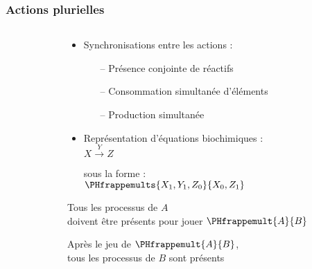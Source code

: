 
\begin{frame}[c]
  \frametitle{Actions plurielles}

\begin{columns}
\begin{column}{.4\textwidth}


\end{column}
\begin{column}{.55\textwidth}
\begin{center}

\begin{itemize}
  \item Synchronisations entre les actions :
  \begin{itemize}
    \item[--] Présence conjointe de réactifs
    \item[--] Consommation simultanée d'éléments
    \item[--] Production simultanée
  \end{itemize}
  \item Représentation d'équations biochimiques :\\
    \centering $X \xrightarrow{Y} Z$\\
    \raggedright sous la forme :\\
    \centering $\PHfrappemults{X_1, Y_1, Z_0}{X_0, Z_1}$
\end{itemize}

\vspace*{.5cm}


\vspace*{.5cm}
Tous les processus de $A$\\
doivent être présents pour jouer $\PHfrappemult{A}{B}$

\medskip
Après le jeu de $\PHfrappemult{A}{B}$,\\
tous les processus de $B$ sont présents
% 
% 
% 

\end{center}
\end{column}
\end{columns}


\end{frame}
